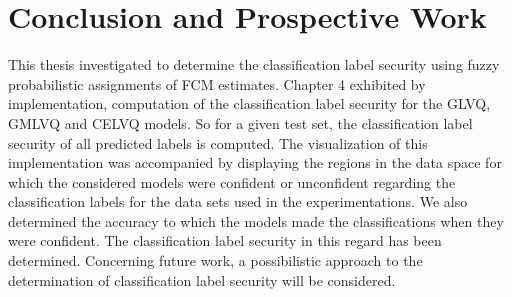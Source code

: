 \chapter{Conclusion and Prospective Work}
This thesis investigated to determine the classification label security using fuzzy probabilistic assignments of FCM estimates. Chapter 4 exhibited by implementation, computation of the classification label security for the GLVQ, GMLVQ and CELVQ models. So for a given test set, the classification label security of all predicted labels is computed. The visualization of this implementation was accompanied by displaying the regions in the data space for which the considered models were confident or unconfident regarding the classification labels for the data sets used in the experimentations. We also determined the accuracy to which the models made the classifications when they were confident. The classification label security in this regard has been determined.
Concerning future work, a possibilistic approach to the determination of classification label security will be considered.
